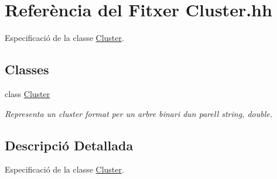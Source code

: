 \hypertarget{_cluster_8hh}{}\section{Referència del Fitxer Cluster.\+hh}
\label{_cluster_8hh}


Especificació de la classe \hyperlink{class_cluster}{Cluster}.  


\subsection*{Classes}
\begin{DoxyCompactItemize}
\item 
class \hyperlink{class_cluster}{Cluster}
\begin{DoxyCompactList}\small\item\em Representa un cluster format per un arbre binari d\textquotesingle{}un parell string, double. \end{DoxyCompactList}\end{DoxyCompactItemize}


\subsection{Descripció Detallada}
Especificació de la classe \hyperlink{class_cluster}{Cluster}. 

